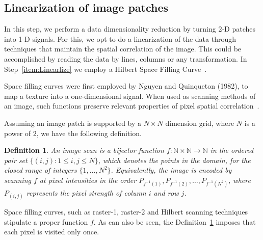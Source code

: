 \documentclass{isprs}
\begin{document}
	\subsection{Linearization of image patches}\label{linearization}
	
	In this step, we perform a data dimensionality reduction by turning 2-D patches into 1-D signals.
	For this, we opt to do a linearization of the data through techniques that maintain the spatial correlation of the image.
	This could be accomplished by reading the data by lines, columns or any transformation.
	In Step~\ref{item:Linearlize} we employ a Hilbert Space Filling Curve~\cite{Lee1994Texture}.
	
	Space filling curves were first employed by Nguyen and Quinqueton (1982), to map a texture into a one-dimensional signal.
	When used as scanning methods of an image, such functions preserve relevant properties of pixel spatial correlation~\cite{Lee1994Texture}.
	
	Assuming an image patch is supported by a $N \times N$ dimension grid, where $N$ is a power of $2$, we have the following definition.
	
	\newtheorem{mydef}{Definition}
	\begin{mydef}
		An image scan is a bijector function $f \colon \mathbb{N} \times \mathbb{N} \to \mathbb{N}$ in the ordered pair set $ \{(i, j): 1 \leq i , j \leq N \}$, which denotes the points in the domain, for the closed range of integers $\{1, \dots, N^2\}$. Equivalently, the image is encoded by scanning $f$ at pixel intensities in the order $P_{f^{-1}(1)}, P_{f^{-1}(2)}, \dots, P_{f^{-1}(N^2)}$, where $P_{(i, j)}$ represents the pixel strength of column $i$ and row $j$.
		\label{def:CurveFilling}
	\end{mydef}
	
	Space filling curves, such as raster-1, raster-2 and Hilbert scanning techniques stipulate a proper function $f$.
	As can also be seen, the Definition~\ref{def:CurveFilling} imposes that each pixel is visited only once.
	
\end{document}
